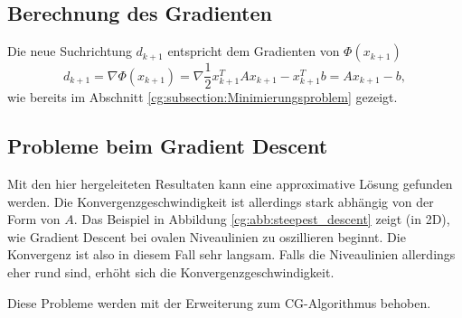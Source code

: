\subsection{Berechnung des Gradienten}
Die neue Suchrichtung $d_{k+1}$ entspricht dem Gradienten von $\Phi(x_{k+1})$ 
\begin{equation}
	d_{k+1} = \nabla \Phi(x_{k+1}) = \nabla \frac{1}{2} x_{k+1}^T A x_{k+1} - x_{k+1}^T b = Ax_{k+1} - b,
\end{equation}
wie bereits im Abschnitt \ref{cg:subsection:Minimierungsproblem} gezeigt.

\subsection{Probleme beim Gradient Descent}
Mit den hier hergeleiteten Resultaten kann eine approximative Lösung gefunden werden.
Die Konvergenzgeschwindigkeit ist allerdings stark abhängig von der Form von $A$.
Das Beispiel in Abbildung \ref{cg:abb:steepest_descent} zeigt (in 2D), wie Gradient Descent bei ovalen Niveaulinien zu oszillieren beginnt.
Die Konvergenz ist also in diesem Fall sehr langsam.
Falls die Niveaulinien allerdings eher rund sind, erhöht sich die Konvergenzgeschwindigkeit.

Diese Probleme werden mit der Erweiterung zum CG-Algorithmus behoben.
